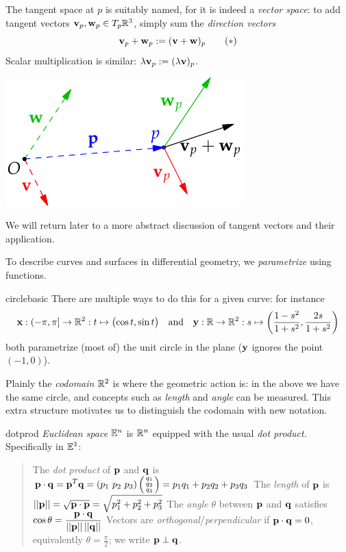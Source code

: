 \begin{minipage}[t]{0.6\linewidth}\vspace{0pt}
The tangent space at $p$ is suitably named, for it is indeed a \emph{vector space}: to add tangent vectors ${\mathbf{v}}_p,{\mathbf{w}}_p\in T_p\mathbb{R}^3$, simply sum the \emph{direction vectors}
\[{\mathbf{v}}_p+{\mathbf{w}}_p:=({\mathbf{v}}+{\mathbf{w}})_p\tag{$\ast$}\]
Scalar multiplication is similar: $\lambda{\mathbf{v}}_p:=(\lambda{\mathbf{v}})_p$. 
\end{minipage}\hfill\begin{minipage}[t]{0.39\linewidth}\vspace{0pt}
	\flushright\includegraphics{euclid-tanvec2}
\end{minipage}


We will return later to a more abstract discussion of tangent vectors and their application.




To describe curves and surfaces in differential geometry, we \emph{parametrize} using functions.

\begin{example}{}{circlebasic}
There are multiple ways to do this for a given curve: for instance
\[{\mathbf{x}}:(-\pi,\pi]\to \mathbb{R}^2: t\mapsto \bigl(\cos t,\sin t\bigr)\quad \text{and} \quad{\mathbf{y}}:\mathbb{R}\to\mathbb{R}^2:s\mapsto \left(\frac{1-s^2}{1+s^2},\frac{2s}{1+s^2}\right)\]
both parametrize (most of) the unit circle in the plane (${\mathbf{y}}$ ignores the point $(-1,0)$).
\end{example}

Plainly the \emph{codomain} $\mathbb{R}^2$ is where the geometric action is: in the above we have the same circle, and concepts such as \emph{length} and \emph{angle} can be measured. This extra structure motivates us to distinguish the codomain with new notation.

\begin{defn}{}{dotprod}
\emph{Euclidean space} $\mathbb{E}^n$ is $\mathbb{R}^n$ equipped with the usual \emph{dot product.} Specifically in $\mathbb{E}^3$:
\begin{quote}
	The \emph{dot product} of ${\mathbf{p}}$ and ${\mathbf{q}}$ is $\displaystyle\vp\cdot\vq=\vp^T\vq=(p_1\ p_2\ p_3)\sthreevec{q_1}{q_2}{q_3}=p_1q_1+p_2q_2+p_3q_3$\smallbreak
	The \emph{length} of ${\mathbf{p}}$ is $\displaystyle\left| \left| {\mathbf{p}}\right|\right|=\sqrt{{\mathbf{p}}\cdot{\mathbf{p}}}=\sqrt{p_1^2+p_2^2+p_3^2}$\smallbreak
	The \emph{angle} $\theta$ between ${\mathbf{p}}$ and ${\mathbf{q}}$ satisfies $\displaystyle\cos\theta=\smash[t]{\frac{{\mathbf{p}}\cdot{\mathbf{q}}}{\left| \left| {\mathbf{p}}\right|\right|\left| \left| {\mathbf{q}}\right|\right|}}$\smallbreak
	Vectors are \emph{orthogonal}/\emph{perpendicular} if ${\mathbf{p}}\cdot{\mathbf{q}}=0$, equivalently $\theta=\frac\pi 2$; we write ${\mathbf{p}}\perp{\mathbf{q}}$.
	\end{quote}
\end{defn}

